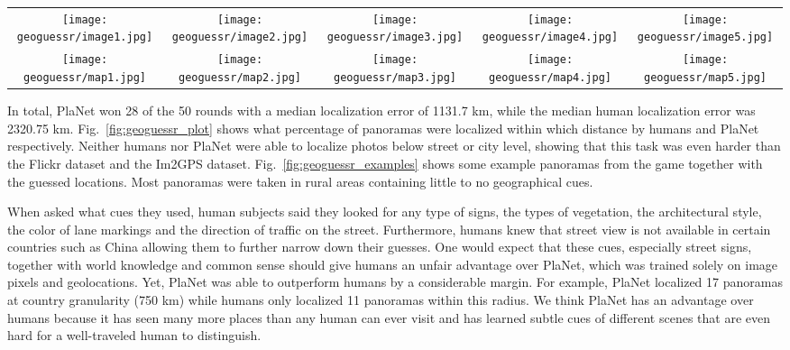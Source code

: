 \documentclass[10pt,twocolumn,letterpaper]{article}
\begin{document}
\begin{figure*}[t]
  \centering
  \def \s {.195}
  \setlength\tabcolsep{1pt}
  \begin{tabular}{ccccc}
    \texttt{[image: geoguessr/image1.jpg]} &
    \texttt{[image: geoguessr/image2.jpg]} &
    \texttt{[image: geoguessr/image3.jpg]} &
    \texttt{[image: geoguessr/image4.jpg]} &
    \texttt{[image: geoguessr/image5.jpg]} \\
    \texttt{[image: geoguessr/map1.jpg]} &
    \texttt{[image: geoguessr/map2.jpg]} &
    \texttt{[image: geoguessr/map3.jpg]} &
    \texttt{[image: geoguessr/map4.jpg]} &
    \texttt{[image: geoguessr/map5.jpg]}
  \end{tabular}
  \caption{Top: GeoGuessr panorama, Bottom: Ground truth location (yellow), human guess (green), PlaNet guess (blue).}
  \label{fig:geoguessr_examples}
\end{figure*}

In total, PlaNet won 28 of the 50 rounds with a median
localization error of 1131.7 km, while the median human localization
error was 2320.75 km. Fig.~\ref{fig:geoguessr_plot} shows what
percentage of panoramas were localized within which distance by humans
and PlaNet respectively. Neither humans nor PlaNet were
able to localize photos below street or city level, showing that this
task was even harder than the Flickr dataset and the Im2GPS dataset.
Fig.~\ref{fig:geoguessr_examples} shows some example panoramas from
the game together with the guessed locations. Most panoramas were
taken in rural areas containing little to no geographical cues.

When asked what cues they used, human subjects said they looked for
any type of signs, the types of vegetation, the architectural style,
the color of lane markings and the direction of traffic on the street.
Furthermore, humans knew that street view is not available in certain
countries such as China allowing them to further narrow down their
guesses. One would expect that these cues, especially street signs,
together with world knowledge and common sense should give humans an
unfair advantage over PlaNet, which was trained solely on image
pixels and geolocations. Yet, PlaNet was able to outperform
humans by a considerable margin. For example, PlaNet localized
17 panoramas at country granularity (750 km) while humans only
localized 11 panoramas within this radius. We think  PlaNet has
an advantage over humans because it has seen many more places than any
human can ever visit and has learned subtle cues of different scenes
that are even hard for a well-traveled human to distinguish.
\end{document}

